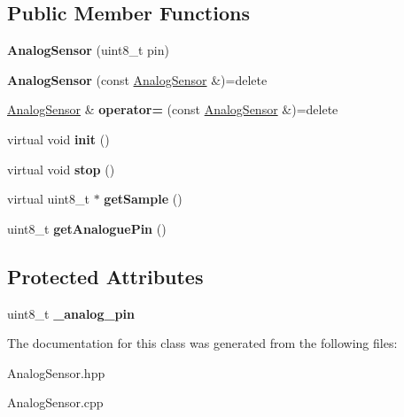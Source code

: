 \subsection*{Public Member Functions}
\begin{DoxyCompactItemize}
\item 
\mbox{\label{classwood_box_1_1sensor_1_1_analog_sensor_a41d8ff91cf91d2bdbccffe8f1316421b}} 
{\bfseries Analog\+Sensor} (uint8\+\_\+t pin)
\item 
\mbox{\label{classwood_box_1_1sensor_1_1_analog_sensor_a8ee0238d3fab4515b5286e67f1f92083}} 
{\bfseries Analog\+Sensor} (const \mbox{\hyperlink{classwood_box_1_1sensor_1_1_analog_sensor}{Analog\+Sensor}} \&)=delete
\item 
\mbox{\label{classwood_box_1_1sensor_1_1_analog_sensor_a66111957aca931c1b1ea219749b03b3c}} 
\mbox{\hyperlink{classwood_box_1_1sensor_1_1_analog_sensor}{Analog\+Sensor}} \& {\bfseries operator=} (const \mbox{\hyperlink{classwood_box_1_1sensor_1_1_analog_sensor}{Analog\+Sensor}} \&)=delete
\item 
\mbox{\label{classwood_box_1_1sensor_1_1_analog_sensor_a9167b7017d6edb4f6a0744d5b1d69b25}} 
virtual void {\bfseries init} ()
\item 
\mbox{\label{classwood_box_1_1sensor_1_1_analog_sensor_a741e58339a78bb9d2986dc7cde8f7d2b}} 
virtual void {\bfseries stop} ()
\item 
\mbox{\label{classwood_box_1_1sensor_1_1_analog_sensor_ae78c25d8c01ba9acd03f90f278966189}} 
virtual uint8\+\_\+t $\ast$ {\bfseries get\+Sample} ()
\item 
\mbox{\label{classwood_box_1_1sensor_1_1_analog_sensor_a5a7c67726db40be3edd48294910b117b}} 
uint8\+\_\+t {\bfseries get\+Analogue\+Pin} ()
\end{DoxyCompactItemize}
\subsection*{Protected Attributes}
\begin{DoxyCompactItemize}
\item 
\mbox{\label{classwood_box_1_1sensor_1_1_analog_sensor_a0377173a16668660f492c52694f96fab}} 
uint8\+\_\+t {\bfseries \+\_\+analog\+\_\+pin}
\end{DoxyCompactItemize}


The documentation for this class was generated from the following files\+:\begin{DoxyCompactItemize}
\item 
Analog\+Sensor.\+hpp\item 
Analog\+Sensor.\+cpp\end{DoxyCompactItemize}
